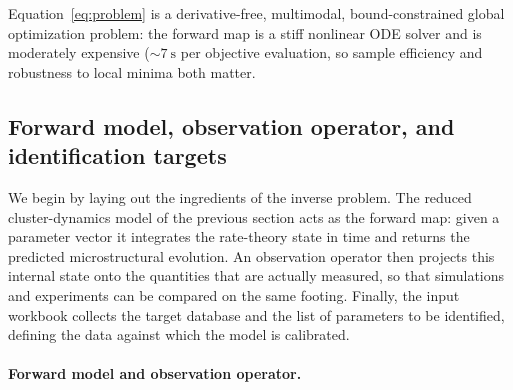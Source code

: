 \documentclass{article}
\begin{document}
Equation~\eqref{eq:problem} is a derivative-free, multimodal, bound-constrained
global optimization problem: the forward map is a stiff nonlinear ODE solver and is
moderately expensive (\(\sim\!\SI{7}{\second}\) per objective evaluation, so sample efficiency and robustness to local minima both matter.

\subsection{Forward model, observation operator, and identification targets}
We begin by laying out the ingredients of the inverse problem. The reduced cluster-dynamics model of the previous section acts as the forward map: given a parameter vector it integrates the rate-theory state in time and returns the predicted microstructural evolution. An observation operator then projects this internal state onto the quantities that are actually measured, so that simulations and experiments can be compared on the same footing. Finally, the input workbook collects the target database and the list of parameters to be identified, defining the data against which the model is calibrated.
\paragraph{Forward model and observation operator.}
\end{document}
